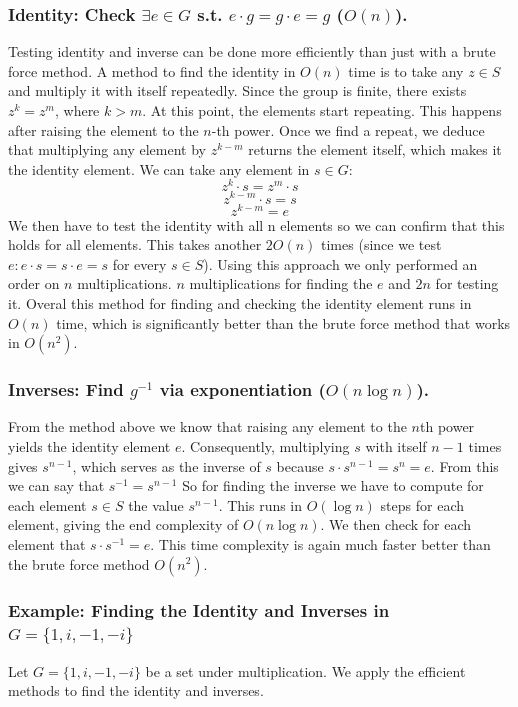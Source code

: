 \documentclass[sigconf]{acmart}
\begin{document}
\subsubsection{Identity: Check \( \exists e \in G \) s.t. \( e \cdot g = g \cdot e = g \) (\( O(n) \)).}
Testing identity and inverse can be done more efficiently than just with a brute force method. 
A method to find the identity in $O(n)$ time is to take any $ z \in S$ and multiply it with itself repeatedly. Since the group is finite, there exists $z^k = z^m$, where $k > m$. At this point, the elements start repeating. This happens after raising the element to the $n$-th power.    
Once we find a repeat, we deduce that multiplying any element by $z^{k-m}$ returns the element itself, which makes it the identity element.
We can take any element in $s \in G$:\[z^k \cdot s = z^m \cdot s\]
\[z^{k-m} \cdot s = s\]
\[z^{k-m}=e\]
We then have to test the identity with all n elements so we can confirm that this holds for all elements. This takes another $2O(n)$ times (since we test \(e: e \cdot s = s \cdot e = s\) for every \(s \in S\)). 
Using this approach we only performed an order on $n$ multiplications. $n$ multiplications for finding the $e$ and $2n$ for testing it. Overal this method for finding and checking the identity element runs in $O(n)$ time, which is significantly better than the brute force method that works in $O(n^2)$.
    
\subsubsection{Inverses: Find \( g^{-1} \) via exponentiation (\( O(n \log n) \)).}
From the method above we know that raising any element to the $n$th power yields the identity element $e$. Consequently, multiplying $s$ with itself $n-1$ times gives $s^{n-1}$, which serves as the inverse of $s$ because $s \cdot s^{n-1} = s^n = e$. From this we can say that $s^{-1} = s^{n-1}$
So for finding the inverse we have to compute for each element $s \in S$ the value $s^{n-1}$. This runs in $O(\log n)$ steps for each element, giving the end complexity of $O(n\log n)$. We then check for each element that $s \cdot s^{-1} = e$. This time complexity is again much faster better than the brute force method $O(n^2)$.

\subsubsection{Example: Finding the Identity and Inverses in \( G = \{1, i, -1, -i\} \)}
Let \( G = \{1, i, -1, -i\} \) be a set under multiplication. We apply the efficient methods to find the identity and inverses.
\end{document}
